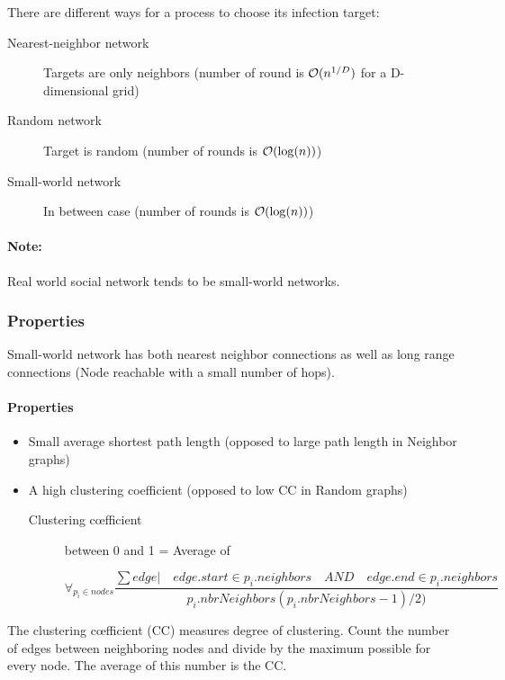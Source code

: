 There are different ways for a process to choose its infection target:

\begin{description}
	\item[Nearest-neighbor network] Targets are only neighbors (number of
	round is $\mathcal{O}(n^{1/D})$ for a D-dimensional grid)
	\item[Random network] Target is random (number of rounds is
	$\mathcal{O}(\log(n))$)
	\item[Small-world network] In between case (number of rounds
	is $\mathcal{O}(\log(n))$)
\end{description}

\paragraph{Note:} Real world social network tends to be small-world networks.


\subsubsection{Properties}

Small-world network has both nearest neighbor connections as well as
long range connections (Node reachable with a small number of hops).

\paragraph{Properties}
\begin{itemize}
	\item Small average shortest path length (opposed to large path length
	in Neighbor graphs)
	\item A high clustering coefficient (opposed to low CC in Random graphs)
	\begin{description}
	\item[Clustering c\oe{}fficient] between 0 and 1 = Average of

        $$\forall_{p_i \in nodes} \frac{\sum { edge | \quad edge.start \in
            p_i.neighbors \quad AND \quad edge.end \in p_i.neighbors }}
            {p_i.nbrNeighbors (p_i.nbrNeighbors-1) /2)}$$

\end{description}
\end{itemize}

The clustering c\oe{}fficient (CC) measures degree of clustering. Count the
number of edges between neighboring nodes and divide by the maximum
possible for every node. The average of this number is the CC.

